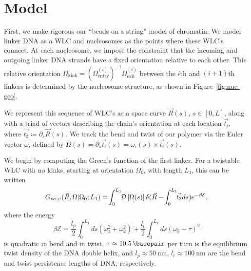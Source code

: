 \documentclass[%
 reprint,
superscriptaddress,
showpacs,preprintnumbers,
 amsmath,amssymb,
 aps,
 prl,
]{revtex4-1}
\newcommand{\gwlc}[2][\Omega_0; L_0]{G_\text{\tiny WLC}(#2|#1)}
\newcommand{\greens}[2][\Omega_0; L]{G(#2|#1)}
\newcommand{\pathd}[1]{\mathcal{D}\left[#1\right]}
\newcommand{\energy}{\mathcal{E}}
\begin{document}
\section{\label{sec:model}Model}
First, we make rigorous our ``beads on a string'' model of chromatin.
We model linker DNA as a WLC and nucleosomes as the points where these
    WLC's connect.
At each nucleosome, we impose the constraint that the incoming and outgoing
    linker DNA strands have a fixed orientation relative to each other.
This relative orientation $\Omega_\text{kink}  =
    {(\Omega^{(i)}_\text{entry})}^{-1}
    \Omega^{(i)}_\text{exit}$ between the $i$th and $(i+1)$th linkers is
    determined by the nucleosome structure, as shown in
    Figure~\ref{fig:nuc-geo}.

We represent this sequence of WLC's as a space curve $\vec{R}(s)$, $s\in[0,L]$, along
    with a triad of vectors describing the chain's orientation at each location
    $\vec{t_i}$, where $\vec{t_3} \coloneqq \partial_s \vec{R}(s)$.
We track the bend and twist of our polymer via the Euler vector $\omega_i$
    defined by $\Omega(s) = \partial_s \vec{t_i}(s) = \omega_i(s) \times \vec{t_i}(s)$.

We begin by computing the Green's function of the first linker.
For a twistable WLC with no kinks, starting at orientation $\Omega_0$, with
    length $L_1$, this can be written
\begin{equation}\label{eq:path}
    \gwlc[\Omega_0;L_1]{\vec{R}, \Omega} =\! \int_{0}^{L_1} \!\! \pathd{\Omega(s)}
              \delta(\vec{R} - \!\int_{0}^{L_1} \!\!\vec{t_3} ds)
              e^{-\beta \mathcal{E}},
\end{equation}
    where the energy
\begin{equation}\label{eq:energy}
    \beta\energy = \frac{l_p}{2}\int_{0}^{L_1} ds
    (\omega_1^2 + \omega_2 ^2) + \frac{l_t}{2}\int_{0}^{L_1} ds
    {\left(\omega_3 - \tau\right)}^2
\end{equation}
    is quadratic in bend and in twist, {$\tau \approx \SI{10.5}{\basepair}$}
    per turn is the equilibrium twist density of the DNA double helix, and {$l_p
    \approx \SI{50}{\nano\metre}$}, {$l_t \approx \SI{100}{\nano\metre}$} are
    the bend and twist persistence lengths of DNA, respectively.
\end{document}
